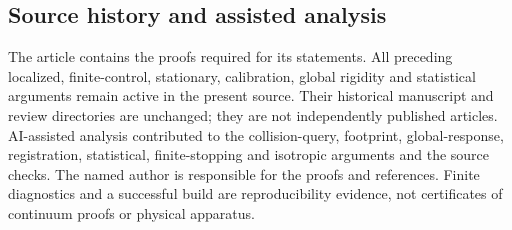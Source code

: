 \documentclass[11pt]{amsart}
\theoremstyle{definition}\newtheorem{definition}[theorem]{Definition}
\theoremstyle{remark}\newtheorem{remark}[theorem]{Remark}
\numberwithin{equation}{section}
\begin{document}
\subsection*{Source history and assisted analysis}
The article contains the proofs required for its statements. All
preceding localized, finite-control, stationary, calibration, global
rigidity and statistical arguments remain active in the present source.
Their historical manuscript and review directories are unchanged; they
are not independently published articles. AI-assisted analysis
contributed to the collision-query, footprint, global-response,
registration, statistical, finite-stopping and isotropic arguments and
the source checks. The named author is responsible for the proofs and
references. Finite diagnostics and a successful build are reproducibility
evidence, not certificates of continuum proofs or physical apparatus.

\end{document}
